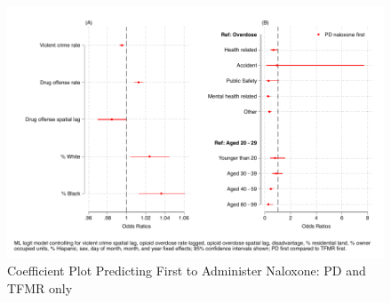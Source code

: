 \newpage
\begin{figure}
    \caption{Coefficient Plot Predicting First to Administer Naloxone: PD and TFMR only}
    \centering
    \includegraphics{figures/me-logit-coef-comb-sens.pdf}
\end{figure}

\newpage
